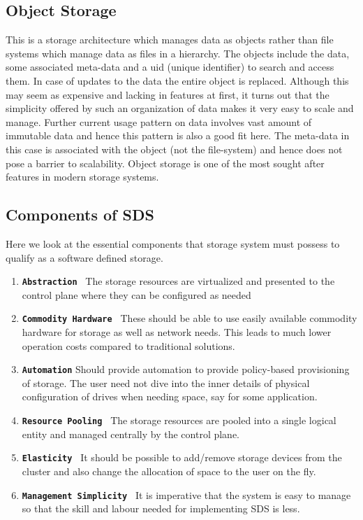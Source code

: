 \documentclass[a4paper,10pt]{article}
\begin{document}
\subsection{Object Storage}
    This is a storage architecture which manages data as objects rather than file systems which manage data as files in a hierarchy. The objects include the data, some associated meta-data and a uid (unique identifier) to search and access them. In case of updates to the data the entire object is replaced. Although this may seem as expensive and lacking in features at first, it turns out that the simplicity offered by such an organization of data makes it very easy to scale and manage. Further current usage pattern on data involves vast amount of immutable data and hence this pattern is also a good fit here. The meta-data in this case is associated with the object (not the file-system) and hence does not pose a barrier to scalability. Object storage is one of the most sought after features in modern storage systems.
    
\subsection{Components of SDS}
Here we look at the essential components that storage system must possess to qualify as a software defined storage.    

\begin{enumerate}[1]

\item  \textbf{\texttt{Abstraction }}  The storage resources are virtualized and presented to the control plane where they can be configured as needed

\item  \textbf{\texttt{Commodity Hardware }} These should be able to use easily available commodity hardware for storage as well as network needs. This leads to much lower operation costs compared to traditional solutions.

\item  \textbf{\texttt{Automation}} Should provide automation to provide policy-based provisioning of storage. The user need not dive into the inner details of physical configuration of drives when needing space, say for some application.  

\item  \textbf{\texttt{Resource Pooling }} The storage resources are pooled into a single logical entity and managed centrally by the control plane. 

\item  \textbf{\texttt{Elasticity }} It should be possible to add/remove storage devices from the cluster and also change the allocation of space to the user on the fly.

\item  \textbf{\texttt{Management Simplicity }} It is imperative that the system is easy to manage so that the skill and labour needed for implementing SDS is less.
\end{enumerate}
\end{document}
